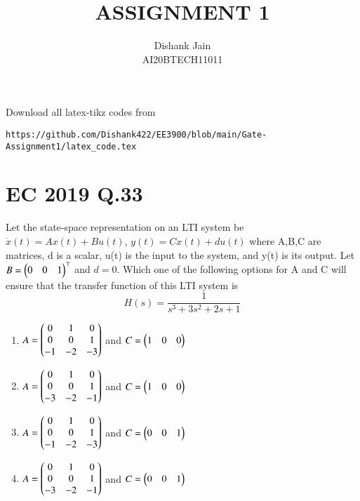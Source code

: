 \documentclass[journal,12pt,twocolumn]{IEEEtran}
\begin{document}
     \def\centbox#1{\makebox[0in]{#1}}
     \def\topbox#1{\raisebox{-\baselineskip}[0in][0in]{#1}}
     \def\midbox#1{\raisebox{-0.5\baselineskip}[0in][0in]{#1}}
\vspace{3cm}
\title{ASSIGNMENT 1}
\author{Dishank Jain \\ AI20BTECH11011}
\maketitle
\newpage
\bigskip
\renewcommand{\thefigure}{\theenumi}
\renewcommand{\thetable}{\theenumi}
Download all latex-tikz codes from 
%
\begin{lstlisting}
https://github.com/Dishank422/EE3900/blob/main/Gate-Assignment1/latex_code.tex
\end{lstlisting}
%
\section{EC 2019 Q.33}
Let the state-space representation on an LTI system be $\dot{x}(t) = Ax(t)+Bu(t)$, $y(t)=Cx(t)+du(t)$ where A,B,C are matrices,  d is a scalar, u(t) is the input to the system, and y(t) is its output. Let $B = \begin{pmatrix} 0 & 0 &  1\end{pmatrix}^\top$ and $d = 0$. Which one of the following options for A and C will ensure that the transfer function of this LTI system is 
\begin{equation}
    H(s) = \dfrac{1}{s^3+3s^2+2s+1}
\end{equation}

\begin{enumerate}[label = (\Alph*)]
    \item $A = \begin{pmatrix}
     0 &  1 &  0\\ 
     0 &  0 &  1\\
    -1 & -2 & -3
    \end{pmatrix}$ and $C = \begin{pmatrix}1 & 0 & 0\end{pmatrix}$
    \item $A = \begin{pmatrix}
     0 &  1 &  0\\ 
     0 &  0 &  1\\
    -3 & -2 & -1
    \end{pmatrix}$ and $C = \begin{pmatrix}1 & 0 & 0\end{pmatrix}$
    \item $A = \begin{pmatrix}
     0 &  1 &  0\\ 
     0 &  0 &  1\\
    -1 & -2 & -3
    \end{pmatrix}$ and $C = \begin{pmatrix}0 & 0 & 1\end{pmatrix}$
    \item $A = \begin{pmatrix}
     0 &  1 &  0\\ 
     0 &  0 &  1\\
    -3 & -2 & -1
    \end{pmatrix}$ and $C = \begin{pmatrix}0 & 0 & 1\end{pmatrix}$
\end{enumerate}
\end{document}

